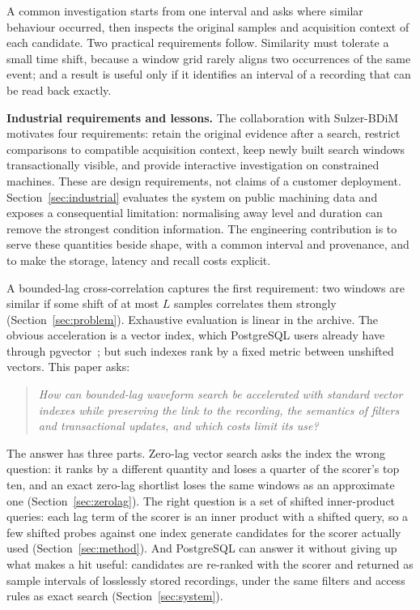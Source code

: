 \documentclass[sigconf]{acmart}
\begin{document}
A common investigation starts from one interval and asks where similar behaviour occurred, then inspects the original samples and acquisition context of each candidate. Two practical requirements follow. Similarity must tolerate a small time shift, because a window grid rarely aligns two occurrences of the same event; and a result is useful only if it identifies an interval of a recording that can be read back exactly.

\textbf{Industrial requirements and lessons.} The collaboration with Sulzer-BDiM motivates four requirements: retain the original evidence after a search, restrict comparisons to compatible acquisition context, keep newly built search windows transactionally visible, and provide interactive investigation on constrained machines. These are design requirements, not claims of a customer deployment. Section~\ref{sec:industrial} evaluates the system on public machining data and exposes a consequential limitation: normalising away level and duration can remove the strongest condition information. The engineering contribution is to serve these quantities beside shape, with a common interval and provenance, and to make the storage, latency and recall costs explicit.

A bounded-lag cross-correlation captures the first requirement: two windows are similar if some shift of at most $L$ samples correlates them strongly (Section~\ref{sec:problem}). Exhaustive evaluation is linear in the archive. The obvious acceleration is a vector index, which PostgreSQL users already have through pgvector~\cite{pgvector}; but such indexes rank by a fixed metric between unshifted vectors. This paper asks:

\begin{quote}\emph{How can bounded-lag waveform search be accelerated with standard vector indexes while preserving the link to the recording, the semantics of filters and transactional updates, and which costs limit its use?}\end{quote}

The answer has three parts. Zero-lag vector search asks the index the wrong question: it ranks by a different quantity and loses a quarter of the scorer's top ten, and an exact zero-lag shortlist loses the same windows as an approximate one (Section~\ref{sec:zerolag}). The right question is a set of shifted inner-product queries: each lag term of the scorer is an inner product with a shifted query, so a few shifted probes against one index generate candidates for the scorer actually used (Section~\ref{sec:method}). And PostgreSQL can answer it without giving up what makes a hit useful: candidates are re-ranked with the scorer and returned as sample intervals of losslessly stored recordings, under the same filters and access rules as exact search (Section~\ref{sec:system}).
\end{document}
